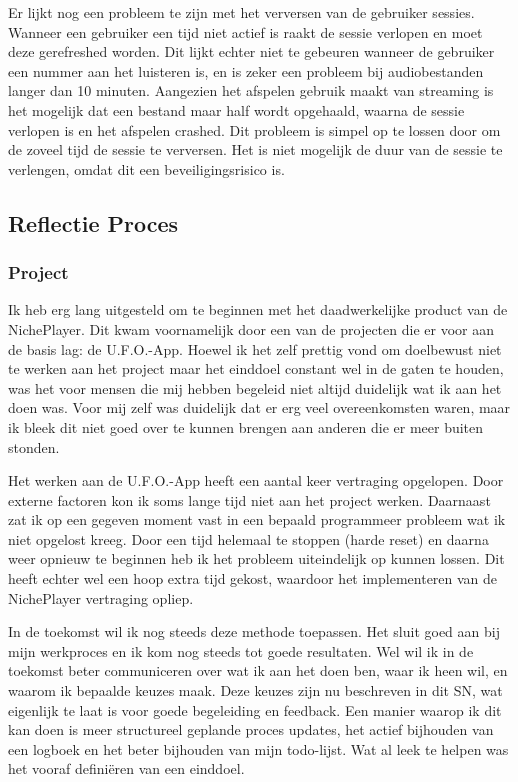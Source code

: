 Er lijkt nog een probleem te zijn met het verversen van de gebruiker sessies. Wanneer een gebruiker een tijd niet actief is raakt de sessie verlopen en moet deze gerefreshed worden. Dit lijkt echter niet te gebeuren wanneer de gebruiker een nummer aan het luisteren is, en is zeker een probleem bij audiobestanden langer dan 10 minuten. Aangezien het afspelen gebruik maakt van streaming is het mogelijk dat een bestand maar half wordt opgehaald, waarna de sessie verlopen is en het afspelen crashed. Dit probleem is simpel op te lossen door om de zoveel tijd de sessie te verversen. Het is niet mogelijk de duur van de sessie te verlengen, omdat dit een beveiligingsrisico is.

\subsection{Reflectie Proces}

\subsubsection*{Project}
Ik heb erg lang uitgesteld om te beginnen met het daadwerkelijke product van de NichePlayer. Dit kwam voornamelijk door een van de projecten die er voor aan de basis lag: de U.F.O.-App. Hoewel ik het zelf prettig vond om doelbewust niet te werken aan het project maar het einddoel constant wel in de gaten te houden, was het voor mensen die mij hebben begeleid niet altijd duidelijk wat ik aan het doen was. Voor mij zelf was duidelijk dat er erg veel overeenkomsten waren, maar ik bleek dit niet goed over te kunnen brengen aan anderen die er meer buiten stonden.

Het werken aan de U.F.O.-App heeft een aantal keer vertraging opgelopen. Door externe factoren kon ik soms lange tijd niet aan het project werken. Daarnaast zat ik op een gegeven moment vast in een bepaald programmeer probleem wat ik niet opgelost kreeg. Door een tijd helemaal te stoppen (harde reset) en daarna weer opnieuw te beginnen heb ik het probleem uiteindelijk op kunnen lossen. Dit heeft echter wel een hoop extra tijd gekost, waardoor het implementeren van de NichePlayer vertraging opliep.

In de toekomst wil ik nog steeds deze methode toepassen. Het sluit goed aan bij mijn werkproces en ik kom nog steeds tot goede resultaten. Wel wil ik in de toekomst beter communiceren over wat ik aan het doen ben, waar ik heen wil, en waarom ik bepaalde keuzes maak. Deze keuzes zijn nu beschreven in dit SN, wat eigenlijk te laat is voor goede begeleiding en feedback. Een manier waarop ik dit kan doen is meer structureel geplande proces updates, het actief bijhouden van een logboek en het beter bijhouden van mijn todo-lijst. Wat al leek te helpen was het vooraf definiëren van een einddoel.

